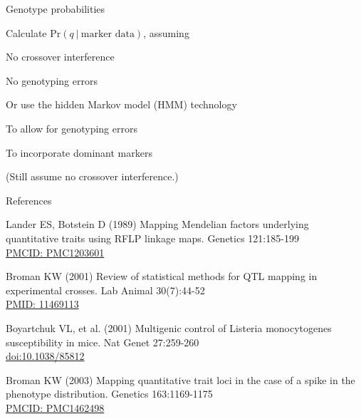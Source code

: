 \documentclass[aspectratio=169,12pt,t]{beamer}
\begin{document}
\begin{frame}{Genotype probabilities}



\bigskip

{\small
Calculate {\hilit $\text{Pr}(q \ | \ \text{marker data})$}, assuming

\sbi
\item No crossover interference
\item No genotyping errors
\ei

\bigskip

Or use the {\hilit hidden Markov model (HMM)} technology

\sbi
\item To allow for genotyping errors
\item To incorporate dominant markers
\item {\hilit (Still assume no crossover interference.)}
\ei
}

\end{frame}



\begin{frame}{References}
\vspace{-7mm}

  \bbi

\item Lander ES, Botstein D (1989) Mapping Mendelian factors
  underlying quantitative traits using RFLP linkage maps. Genetics
  121:185-199 \\
  \href{https://www.ncbi.nlm.nih.gov/pmc/articles/PMC1203601}{\footnotesize
    PMCID: PMC1203601}

\item Broman KW (2001) Review of statistical methods for QTL mapping
  in experimental crosses. Lab Animal 30(7):44-52 \\
  \href{https://www.ncbi.nlm.nih.gov/pubmed/11469113}{\footnotesize
    PMID: 11469113}

\item Boyartchuk VL, et al. (2001) Multigenic control of Listeria monocytogenes
  susceptibility in mice. Nat Genet 27:259-260 \\
  \href{https://doi.org/10.1038/85812}{\footnotesize doi:10.1038/85812}

\item Broman KW (2003) Mapping quantitative trait loci in the case
  of a spike in the phenotype distribution. Genetics 163:1169-1175 \\
  \href{https://www.ncbi.nlm.nih.gov/pmc/articles/PMC1462498}{\footnotesize
    PMCID: PMC1462498}

\ei


\end{frame}
\end{document}
